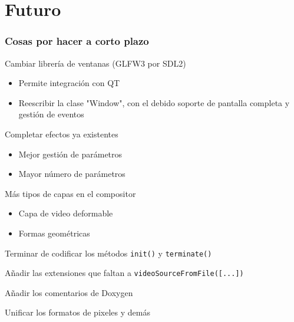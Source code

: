 \documentclass{beamer}
\begin{document}
%
%
\section{Futuro}

\begin{frame}[t] \frametitle{Cosas por hacer a corto plazo}
	\begin{itemize}
		\begin{item}
			Cambiar librería de ventanas (GLFW3 por SDL2)
			\begin{itemize}
				\item{Permite integración con QT}
				\item{Reescribir la clase "Window", con el debido soporte de pantalla completa y gestión de eventos}
			\end{itemize}
		\end{item}
		\begin{item}
			Completar efectos ya existentes
			\begin{itemize}
				\item{Mejor gestión de parámetros}
				\item{Mayor número de parámetros}
			\end{itemize}
		\end{item}
		\begin{item}
			Más tipos de capas en el compositor
			\begin{itemize}
				\item{Capa de video deformable}
				\item{Formas geométricas}
			\end{itemize}
		\end{item}
		\begin{item}
			Terminar de codificar los métodos \texttt{init()} y \texttt{terminate()}
		\end{item}
		\begin{item}
			Añadir las extensiones que faltan a \texttt{videoSourceFromFile([...])}
		\end{item}
		\begin{item}
			Añadir los comentarios de Doxygen
		\end{item}
		\begin{item}
			Unificar los formatos de pixeles y demás
		\end{item}
	\end{itemize}
\end{frame}
\end{document}

